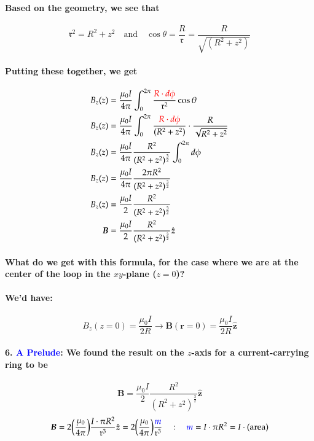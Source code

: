 \documentclass{article}
\begin{document}
\paragraph{Based on the geometry, we see that}
\begin{equation*}
    \mathfrak{r}^2=R^2+z^2\quad\text{and}\quad \cos\theta=\frac{R}{\mathfrak{r}}=\frac{R}{\sqrt{(R^2+z^2)}}
\end{equation*}
\paragraph{Putting these together, we get}
\begin{align*}
     B_z(z)&=\frac{\mu_0I}{4\pi}\int_0^{2\pi}\frac{\textcolor{red}{R\cdot d\phi}}{\mathfrak{r}^2}\cos\theta\\
    B_z(z)&=\frac{\mu_0I}{4\pi}\int_0^{2\pi}\frac{\textcolor{red}{R\cdot d\phi}}{(R^2+z^2)}\cdot\frac{R}{\sqrt{R^2+z^2}}\\
    B_z(z)&=\frac{\mu_0I}{4\pi}\frac{R^2}{(R^2+z^2)^{\frac{3}{2}}}\int_0^{2\pi}d\phi\\
    B_z(z)&=\frac{\mu_0I}{4\pi}\frac{2\pi R^2}{(R^2+z^2)^{\frac{3}{2}}}\\
    B_z(z)&=\frac{\mu_0I}{2}\frac{R^2}{(R^2+z^2)^{\frac{3}{2}}}\\
    \boldsymbol{B}&=\frac{\mu_0I}{2}\frac{R^2}{(R^2+z^2)^{\frac{3}{2}}}\hat{\boldsymbol{z}}\\
\end{align*}
\paragraph{What do we get with this formula, for the case where we are at the center of the loop in the $xy$-plane ($z=0$)?}
\paragraph{We'd have:}
\begin{equation*}
    B_z(z=0)=\frac{\mu_0I}{2R}\longrightarrow \boldsymbol{B}(\boldsymbol{r}=0)=\frac{\mu_0I}{2R}\hat{\boldsymbol{z}}
\end{equation*}
\paragraph{6. \textcolor{blue}{A Prelude}: We found the result on the $z$-axis for a current-carrying ring to be}
\begin{equation*}
    \boldsymbol{B}=\frac{\mu_0I}{2}\frac{R^2}{(R^2+z^2)^{\frac{3}{2}}}\hat{\boldsymbol{z}}
\end{equation*}
\begin{equation*}
    \boldsymbol{B}=2\bigg(\frac{\mu_0}{4\pi}\bigg)\frac{I\cdot\pi R^2}{\mathfrak{r}^3}\hat{\boldsymbol{z}}=2\bigg(\frac{\mu_0}{4\pi}\bigg)\frac{\textcolor{blue}{m}}{\mathfrak{r}^3}\quad:\quad\textcolor{blue}{m}=I\cdot\pi R^2=I\cdot(\text{area})
\end{equation*}
\end{document}
